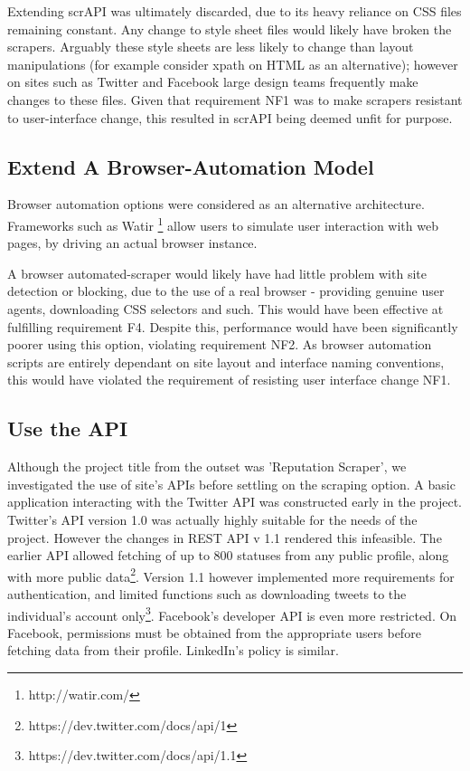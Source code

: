 Extending scrAPI was ultimately discarded, due to its heavy reliance on CSS files remaining constant. Any change to style sheet files would likely have broken the scrapers. Arguably these style sheets are less likely to change than layout manipulations (for example consider xpath on HTML as an alternative); however on sites such as Twitter and Facebook large design teams frequently make changes to these files. Given that requirement NF1 was to make scrapers resistant to user-interface change, this resulted in scrAPI being deemed unfit for purpose. 

\subsection{Extend A Browser-Automation Model}

Browser automation options were considered as an alternative architecture. Frameworks such as Watir \footnote{http://watir.com/} allow users to simulate user interaction with web pages, by driving an actual browser instance.

A browser automated-scraper would likely have had little problem with site detection or blocking, due to the use of a real browser - providing genuine user agents, downloading CSS selectors and such. This would have been effective at fulfilling requirement F4. Despite this, performance would have been significantly poorer using this option, violating requirement NF2. As browser automation scripts are entirely dependant on site layout and interface naming conventions, this would have violated the requirement of resisting user interface change NF1. 

\subsection{Use the API}

Although the project title from the outset was 'Reputation Scraper', we investigated the use of site's APIs before settling on the scraping option. A basic application interacting with the Twitter API was constructed early in the project. Twitter's API version 1.0 was actually highly suitable for the needs of the project. However the changes in REST API v 1.1 rendered this infeasible. The earlier API allowed fetching of up to 800 statuses from any public profile, along with more public data\footnote{https://dev.twitter.com/docs/api/1}. Version 1.1 however implemented more requirements for authentication, and limited functions such as downloading tweets to the individual's account only\footnote{https://dev.twitter.com/docs/api/1.1}. Facebook's developer API is even more restricted. On Facebook, permissions must be obtained from the appropriate users before fetching data from their profile. LinkedIn's policy is similar. %

